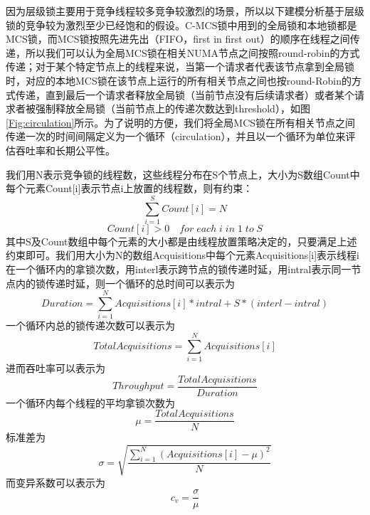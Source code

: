 因为层级锁主要用于竞争线程较多竞争较激烈的场景，所以以下建模分析基于层级锁的竞争较为激烈至少已经饱和的假设。C-MCS锁中用到的全局锁和本地锁都是MCS锁，而MCS锁按照先进先出（FIFO，first in first out）的顺序在线程之间传递，所以我们可以认为全局MCS锁在相关NUMA节点之间按照round-robin的方式传递；对于某个特定节点上的线程来说，当第一个请求者代表该节点拿到全局锁时，对应的本地MCS锁在该节点上运行的所有相关节点之间也按round-Robin的方式传递，直到最后一个请求者释放全局锁（当前节点没有后续请求者）或者某个请求者被强制释放全局锁（当前节点上的传递次数达到threshold），如图\ref{Fig:circulation}所示。为了说明的方便，我们将全局MCS锁在所有相关节点之间传递一次的时间间隔定义为一个循环（circulation），并且以一个循环为单位来评估吞吐率和长期公平性。


我们用N表示竞争锁的线程数，这些线程分布在S个节点上，大小为S数组Count中每个元素Count[i]表示节点i上放置的线程数，则有约束：
\begin{equation}\label{Eq:threads}
  \sum_{i=1}^{S} Count[i] = N
\end{equation}
\begin{equation}\label{Eq:non-zero}
  Count[i] > 0 \quad for\;each\;  i\; in\; 1\;to\;S
\end{equation}
其中S及Count数组中每个元素的大小都是由线程放置策略决定的，只要满足上述约束即可。我们用大小为N的数组Acquisitions中每个元素Acquisitions[i]表示线程i在一个循环内的拿锁次数，用interl表示跨节点的锁传递时延，用intral表示同一节点内的锁传递时延，则一个循环的总时间可以表示为
\begin{equation}\label{Eq:duration}
 Duration=\sum_{i=1}^{N} Acquisitions[i] * intral + S * (interl - intral)
\end{equation}
一个循环内总的锁传递次数可以表示为
\begin{equation}\label{Eq:totalacqui}
  TotalAcquisitions=\sum_{i=1}^{N} Acquisitions[i]
\end{equation}
进而吞吐率可以表示为
\begin{equation}\label{Eq:total-thrpt}
 Throughput=\frac{TotalAcquisitions}{Duration}
\end{equation}
一个循环内每个线程的平均拿锁次数为
\begin{equation}\label{Eq:AVG}
  \mu = \frac{TotalAcquisitions}{N}
\end{equation}
标准差为
\begin{equation}\label{Eq:SD}
  \sigma=\sqrt{\frac{\sum_{i=1}^N(Acquisitions[i]-\mu)^2}{N}}
\end{equation}
而变异系数可以表示为
\begin{equation}\label{Eq:CV}
 c_v=\frac{\sigma}{\mu}
\end{equation}

